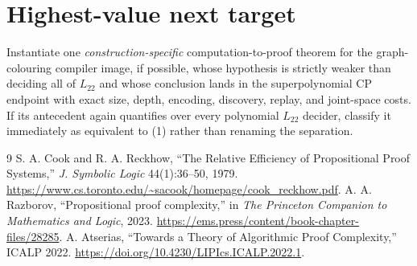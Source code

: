 \documentclass[11pt]{article}
\newcommand{\Ltwo}{L_{22}}
\begin{document}
\section{Highest-value next target}
Instantiate one \emph{construction-specific} computation-to-proof theorem
for the graph-colouring compiler image, if possible, whose hypothesis is
strictly weaker than deciding all of $\Ltwo$ and whose conclusion lands in
the superpolynomial CP endpoint with exact size, depth, encoding, discovery,
replay, and joint-space costs.  If its antecedent again quantifies over every
polynomial $\Ltwo$ decider, classify it immediately as equivalent to (1)
rather than renaming the separation.

\begin{thebibliography}{9}
 S. A. Cook and R. A. Reckhow, ``The Relative Efficiency of
Propositional Proof Systems,'' \emph{J. Symbolic Logic} 44(1):36--50, 1979.
\url{https://www.cs.toronto.edu/~sacook/homepage/cook_reckhow.pdf}.
 A. A. Razborov, ``Propositional proof complexity,'' in
\emph{The Princeton Companion to Mathematics and Logic}, 2023.
\url{https://ems.press/content/book-chapter-files/28285}.
 A. Atserias, ``Towards a Theory of Algorithmic Proof
Complexity,'' ICALP 2022. \url{https://doi.org/10.4230/LIPIcs.ICALP.2022.1}.
\end{thebibliography}
\end{document}
